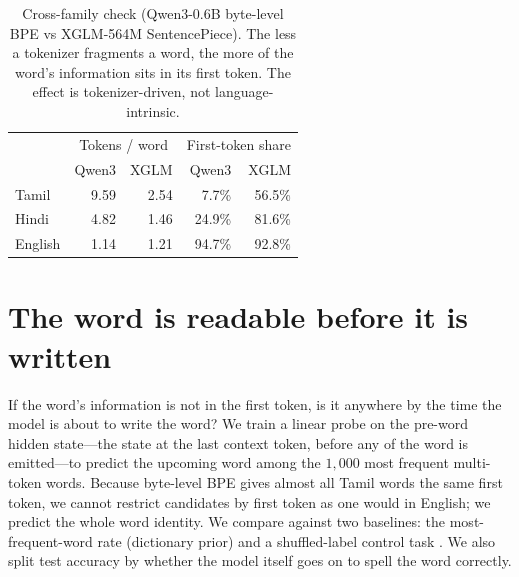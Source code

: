 \documentclass[11pt]{article}
\begin{document}
\begin{table}[t]
\centering\small
\begin{tabular}{lrrrr}
\toprule
 & \multicolumn{2}{c}{Tokens / word} & \multicolumn{2}{c}{First-token share} \\
 & Qwen3 & XGLM & Qwen3 & XGLM \\
\midrule
Tamil   & 9.59 & 2.54 & 7.7\%  & 56.5\% \\
Hindi   & 4.82 & 1.46 & 24.9\% & 81.6\% \\
English & 1.14 & 1.21 & 94.7\% & 92.8\% \\
\bottomrule
\end{tabular}
\caption{Cross-family check (Qwen3-0.6B byte-level BPE vs XGLM-564M
SentencePiece). The less a tokenizer fragments a word, the more of the word's
information sits in its first token. The effect is tokenizer-driven, not
language-intrinsic.}
\label{tab:family}
\end{table}

\section{The word is readable before it is written}
\label{sec:probe}

If the word's information is not in the first token, is it anywhere by the time
the model is about to write the word? We train a linear probe on the pre-word
hidden state---the state at the last context token, before any of the word is
emitted---to predict the upcoming word among the $1{,}000$ most frequent
multi-token words. Because byte-level BPE gives almost all Tamil words the same
first token, we cannot restrict candidates by first token as one would in
English; we predict the whole word identity. We compare against two baselines:
the most-frequent-word rate (dictionary prior) and a shuffled-label control
task \citep{hewitt2019control}. We also split test accuracy by whether the
model itself goes on to spell the word correctly.
\end{document}
